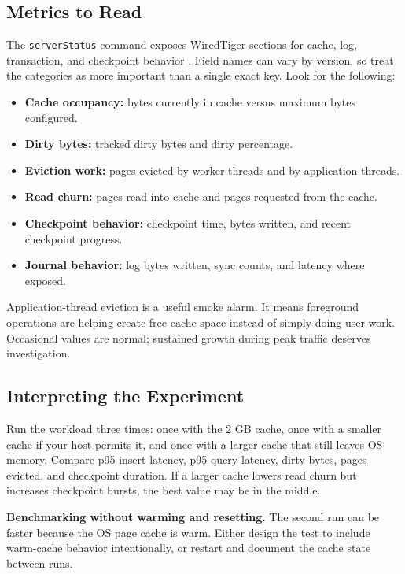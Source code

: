 \subsection{Metrics to Read}
The \texttt{serverStatus} command exposes WiredTiger sections for cache, log, transaction, and checkpoint behavior \cite{mongodbServerStatusDocs}. Field names can vary by version, so treat the categories as more important than a single exact key. Look for the following:

\begin{itemize}
    \item \textbf{Cache occupancy:} bytes currently in cache versus maximum bytes configured.
    \item \textbf{Dirty bytes:} tracked dirty bytes and dirty percentage.
    \item \textbf{Eviction work:} pages evicted by worker threads and by application threads.
    \item \textbf{Read churn:} pages read into cache and pages requested from the cache.
    \item \textbf{Checkpoint behavior:} checkpoint time, bytes written, and recent checkpoint progress.
    \item \textbf{Journal behavior:} log bytes written, sync counts, and latency where exposed.
\end{itemize}

\begin{notebox}
Application-thread eviction is a useful smoke alarm. It means foreground operations are helping create free cache space instead of simply doing user work. Occasional values are normal; sustained growth during peak traffic deserves investigation.
\end{notebox}

\subsection{Interpreting the Experiment}
Run the workload three times: once with the 2 GB cache, once with a smaller cache if your host permits it, and once with a larger cache that still leaves OS memory. Compare p95 insert latency, p95 query latency, dirty bytes, pages evicted, and checkpoint duration. If a larger cache lowers read churn but increases checkpoint bursts, the best value may be in the middle.

\begin{pitfall}
\textbf{Benchmarking without warming and resetting.} The second run can be faster because the OS page cache is warm. Either design the test to include warm-cache behavior intentionally, or restart and document the cache state between runs.
\end{pitfall}

